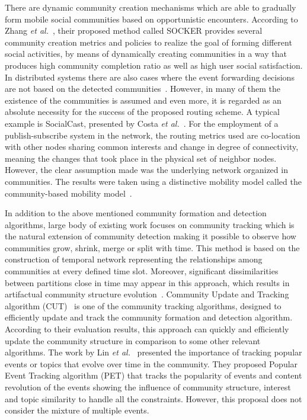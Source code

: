 There are dynamic community creation mechanisms which are able to gradually form mobile social communities based on opportunistic encounters. According to Zhang {\it et al.}~\cite{DZhang2011}, their proposed method called SOCKER provides several community creation metrics and policies to realize the goal of forming different social activities, by means of dynamically creating communities in a way that produces high community completion ratio as well as high user social satisfaction. In distributed systems there are also cases where the event forwarding decisions are not based on the detected communities~\cite{NVastardis2013}. However, in many of them the existence of the communities is assumed and even more, it is regarded as an absolute necessity for the success of the proposed routing scheme. A typical example is SocialCast, presented by Costa {\it et al.}~\cite{PCosta2008}. For the employment of a publish-subscribe system in the network, the routing metrics used are co-location with other nodes sharing common interests and change in degree of connectivity, meaning the changes that took place in the physical set of neighbor nodes. However, the clear assumption made was the underlying network organized in communities. The results were taken using a distinctive mobility model called the community-based mobility model~\cite{MMusolesi2004}.

In addition to the above mentioned community formation and detection algorithms, large body of existing work focuses on community tracking which is the natural extension of community detection making it possible to observe how communities grow, shrink, merge or split with time. This method is based on the construction of temporal network representing the relationships among communities at every defined time slot. Moreover, significant dissimilarities between partitions close in time may appear in this approach, which results in artifactual community structure evolution~\cite{BMitra2012}. Community Update and Tracking algorithm (CUT)~\cite{HSMa2013} is one of the community tracking algorithms, designed to efficiently update and track the community formation and detection algorithm. According to their evaluation results, this approach can quickly and efficiently update the community structure in comparison to some other relevant algorithms. The work by Lin {\it et al.}~\cite{CXLin2010} presented the importance of tracking popular events or topics that evolve over time in the community. They proposed Popular Event Tracking algorithm (PET) that tracks the popularity of events and content revolution of the events showing the influence of community structure, interest and topic similarity to handle all the constraints. However, this proposal does not consider the mixture of multiple events.

